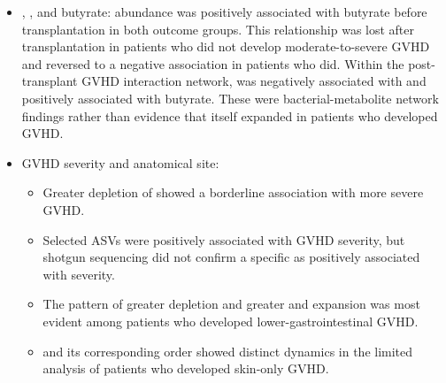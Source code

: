 \begin{itemize}
\item \taxFaecalibacterium, \taxClostridiumXIVb, and butyrate: \taxFaecalibacterium abundance was positively associated with butyrate before transplantation in both outcome groups. This relationship was lost after transplantation in patients who did not develop moderate-to-severe GVHD and reversed to a negative association in patients who did. Within the post-transplant GVHD interaction network, \taxClostridiumXIVb was negatively associated with \taxFaecalibacterium and positively associated with butyrate. These were bacterial-metabolite network findings rather than evidence that \taxClostridiumXIVb itself expanded in patients who developed GVHD.

\item GVHD severity and anatomical site:
  \begin{itemize}
  \item Greater depletion of \taxButyricicoccusBare showed a borderline association with more severe GVHD.
  \item Selected \taxBacteroides ASVs were positively associated with GVHD severity, but shotgun sequencing did not confirm a specific \taxBacteroidesSpecies as positively associated with severity.
  \item The pattern of greater \taxClostridiales depletion and greater \taxEfaecium and \taxParabacteroides expansion was most evident among patients who developed lower-gastrointestinal GVHD.
  \item \taxVeillonellaceae and its corresponding order \taxSelenomonadales showed distinct dynamics in the limited analysis of patients who developed skin-only GVHD.
  \end{itemize}

\end{itemize}
